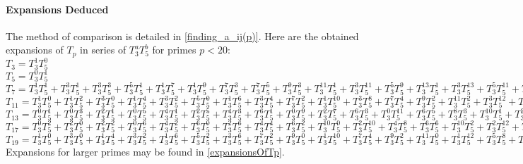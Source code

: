 \paragraph{Expansions Deduced}
The method of comparison is detailed in \ref{finding_a_ij(p)}.
Here are the obtained expansions of $T_p$ in series of $T_3^aT_5^b$ for primes $p<20$:\\
$T_{3} = T_3^{1}T_5^{0}$\\
$T_{5} = T_3^{0}T_5^{1}$\\
$T_{7} = T_3^{1}T_5^{1} + T_3^{3}T_5^{1} + T_3^{3}T_5^{3} + T_3^{5}T_5^{1} + T_3^{1}T_5^{7} + T_3^{1}T_5^{9} + T_3^{7}T_5^{3} + T_3^{7}T_5^{5} + T_3^{9}T_5^{3} + T_3^{11}T_5^{1} + T_3^{3}T_5^{11} + T_3^{5}T_5^{9} + T_3^{13}T_5^{1} + T_3^{3}T_5^{13} + T_3^{5}T_5^{11} + T_3^{9}T_5^{7} + T_3^{11}T_5^{5} + T_3^{13}T_5^{3} + T_3^{3}T_5^{15} + T_3^{7}T_5^{11} + T_3^{9}T_5^{9} + T_3^{13}T_5^{5} + T_3^{15}T_5^{3} + \dots $\\   
$T_{11} = T_3^{1}T_5^{0} + T_3^{1}T_5^{2} + T_3^{3}T_5^{0} + T_3^{1}T_5^{4} + T_3^{3}T_5^{2} + T_3^{5}T_5^{0} + T_3^{1}T_5^{6} + T_3^{3}T_5^{4} + T_3^{7}T_5^{2} + T_3^{1}T_5^{10} + T_3^{3}T_5^{8} + T_3^{7}T_5^{4} + T_3^{9}T_5^{2} + T_3^{11}T_5^{2} + T_3^{3}T_5^{12} + T_3^{5}T_5^{10} + T_3^{7}T_5^{8} + T_3^{11}T_5^{4} + T_3^{13}T_5^{2} + T_3^{9}T_5^{8} + T_3^{17}T_5^{0} + \dots $\\
$T_{13} = T_3^{0}T_5^{1} + T_3^{0}T_5^{3} + T_3^{2}T_5^{1} + T_3^{0}T_5^{5} + T_3^{4}T_5^{1} + T_3^{2}T_5^{5} + T_3^{4}T_5^{3} + T_3^{6}T_5^{1} + T_3^{0}T_5^{9} + T_3^{2}T_5^{7} + T_3^{6}T_5^{3} + T_3^{0}T_5^{11} + T_3^{6}T_5^{5} + T_3^{8}T_5^{3} + T_3^{10}T_5^{1} + T_3^{2}T_5^{11} + T_3^{4}T_5^{9} + T_3^{6}T_5^{7} + T_3^{10}T_5^{3} + T_3^{2}T_5^{13} + T_3^{4}T_5^{11} + T_3^{14}T_5^{1} + T_3^{2}T_5^{15} + T_3^{4}T_5^{13} + T_3^{6}T_5^{11} + T_3^{12}T_5^{5} + T_3^{16}T_5^{1} + \dots $\\
$T_{17} = T_3^{0}T_5^{2} + T_3^{2}T_5^{0} + T_3^{2}T_5^{2} + T_3^{0}T_5^{6} + T_3^{4}T_5^{2} + T_3^{6}T_5^{0} + T_3^{2}T_5^{6} + T_3^{4}T_5^{4} + T_3^{6}T_5^{2} + T_3^{10}T_5^{0} + T_3^{2}T_5^{10} + T_3^{4}T_5^{8} + T_3^{6}T_5^{6} + T_3^{10}T_5^{2} + T_3^{2}T_5^{12} + T_3^{6}T_5^{8} + T_3^{10}T_5^{4} + T_3^{2}T_5^{14} + T_3^{6}T_5^{10} + T_3^{8}T_5^{8} + T_3^{12}T_5^{4} + T_3^{14}T_5^{2} + T_3^{4}T_5^{14} + T_3^{8}T_5^{10} + T_3^{10}T_5^{8} + T_3^{12}T_5^{6} + T_3^{16}T_5^{2} + T_3^{18}T_5^{0} + \dots $\\
$T_{19} = T_3^{1}T_5^{0} + T_3^{3}T_5^{0} + T_3^{1}T_5^{4} + T_3^{3}T_5^{2} + T_3^{1}T_5^{6} + T_3^{5}T_5^{2} + T_3^{3}T_5^{6} + T_3^{7}T_5^{2} + T_3^{9}T_5^{0} + T_3^{1}T_5^{10} + T_3^{7}T_5^{4} + T_3^{9}T_5^{2} + T_3^{11}T_5^{0} + T_3^{1}T_5^{12} + T_3^{5}T_5^{8} + T_3^{11}T_5^{2} + T_3^{13}T_5^{0} + T_3^{3}T_5^{12} + T_3^{7}T_5^{8} + T_3^{9}T_5^{6} + T_3^{11}T_5^{4} + T_3^{13}T_5^{2} + T_3^{3}T_5^{14} + T_3^{7}T_5^{10} + T_3^{11}T_5^{6} + T_3^{15}T_5^{2} + T_3^{17}T_5^{0} + \dots $\\
Expansions for larger primes may be found in \ref{expansionsOfTp}.






